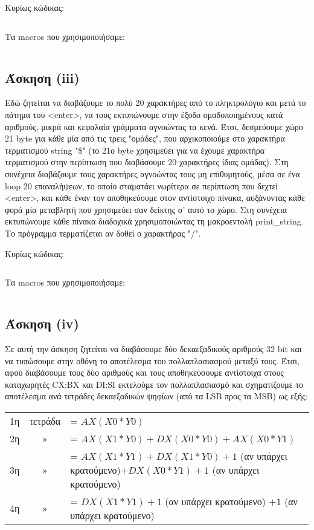 \documentclass[a4paper,10pt]{article} \usepackage{anysize}
\begin{document}
\noindent Κυρίως κώδικας:
\inputminted[linenos,obeytabs,fontsize=\footnotesize]{nasm}{files/2.asm}
Τα macros που χρησιμοποιήσαμε:
\inputminted[linenos,obeytabs,fontsize=\footnotesize]{nasm}{files/2.txt}
\subsection*{Άσκηση (iii)}
Εδώ ζητείται να διαβάζουμε το πολύ 20 χαρακτήρες από το πληκτρολόγιο
και μετά το πάτημα του <enter>, να τους εκτυπώνουμε
στην έξοδο ομαδοποιημένους κατά αριθμούς, μικρά και κεφαλαία γράμματα
αγνοώντας τα κενά. Έτσι, δεσμεύουμε χώρο 21 byte για κάθε μία από τις τρεις
"ομάδες", που αρχικοποιούμε στο χαρακτήρα τερματισμού string "\$" (το 21ο byte
χρησιμεύει για να έχουμε χαρακτήρα τερματισμού στην περίπτωση που διαβάσουμε
20 χαρακτήρες ίδιας ομάδας).  Στη συνέχεια διαβάζουμε τους χαρακτήρες
αγνοώντας τους μη επιθυμητούς, μέσα σε ένα loop 20 επαναλήψεων, 
το οποίο σταματάει νωρίτερα σε περίπτωση που δεχτεί <enter>, 
και κάθε έναν τον αποθηκεύουμε στον αντίστοιχο πίνακα,
αυξάνοντας κάθε φορά μία μεταβλητή που χρησιμεύει σαν δείκτης σ' αυτό το χώρο.
Στη συνέχεια εκτυπώνουμε κάθε πίνακα διαδοχικά χρησιμοποιώντας τη
μακροεντολή print\_string. Το πρόγραμμα τερματίζεται αν δοθεί ο χαρακτήρας "/".

\noindent Κυρίως κώδικας:
\inputminted[linenos,obeytabs,fontsize=\footnotesize]{nasm}{files/3.asm}
Τα macros που χρησιμοποιήσαμε:
\inputminted[linenos,obeytabs,fontsize=\footnotesize]{nasm}{files/3.txt}
\subsection*{Άσκηση (iv)}
Σε αυτή την άσκηση ζητείται να διαβάσουμε δύο δεκαεξαδικούς αριθμούς 32 bit
και να τυπώσουμε στην οθόνη το αποτέλεσμα του πολλαπλασιασμού μεταξύ τους.
Έτσι, αφού διαβάσουμε τους δύο αριθμούς και τους αποθηκεύσουμε αντίστοιχα
στους καταχωρητές CX:BX και DI:SI  εκτελούμε τον πολλαπλασιασμό και
σχηματίζουμε το αποτέλεσμα ανά τετράδες δεκαεξαδικών ψηφίων (από τα LSB προς
τα MSB) ως εξής:

\begin{tabular}{l c l}
1η & τετράδα & = $AX(X0*Y0)$\\
2η & » & =  $AX(X1*Y0)+ DX(X0*Y0) + AX(X0*Y1)$\\
3η & » & = \parbox{13cm}{$AX(X1*Y1) + DX(X1*Y0) + 1$ (αν υπάρχει κρατούμενο)$ +  DX(X0*Y1) +
1$ (αν υπάρχει κρατούμενο)}\\
4η & » & = $DX(X1*Y1) + 1$ (αν υπάρχει κρατούμενο) $+ 1$ (αν υπάρχει κρατούμενο)\\
\end{tabular}
\end{document}
